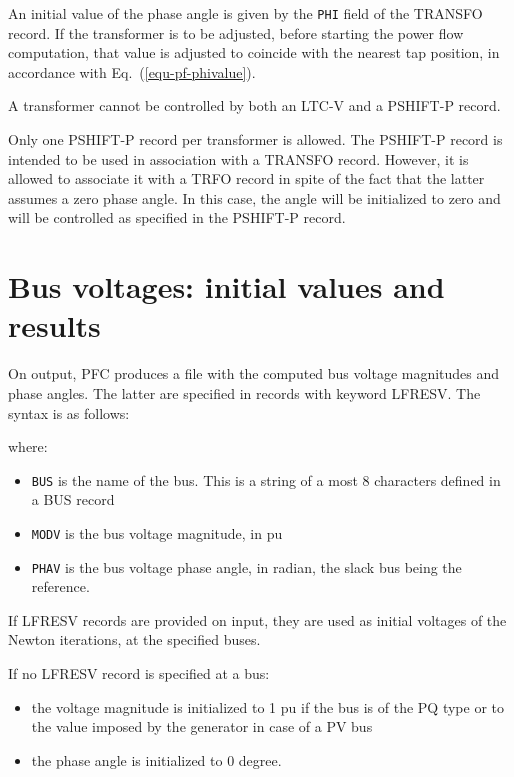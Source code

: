 An initial value of the phase angle is given by the {\tt PHI} field of the TRANSFO record. If the transformer is to be adjusted, before starting the power flow computation, that value is adjusted to coincide with the nearest tap position, in accordance with Eq.~(\ref{equ-pf-phivalue}).

A transformer cannot be controlled by both an LTC-V and a PSHIFT-P record.

Only one PSHIFT-P record per transformer is allowed. The PSHIFT-P record is intended to be used in association with a TRANSFO record. However, it is allowed to associate it with a TRFO record in spite of the fact that the latter assumes a zero phase angle. In this case, the angle will be initialized to zero and will be controlled as specified in the PSHIFT-P record.


\section{Bus voltages: initial values and results}\label{sec-lfresv}

On output, PFC produces a file with the computed bus voltage magnitudes and phase angles. The latter are specified in records with keyword LFRESV. The syntax is as follows:

\hspace*{5ex}{\tt LFRESV BUS MODV PHASV ;}

where:
\begin{itemize}
\item {\tt BUS} is the name of the bus. This is a string of a most 8 characters defined in a BUS record
\item {\tt MODV} is the bus voltage magnitude, in pu
\item {\tt PHAV} is the bus voltage phase angle, in radian, the slack bus being the reference.
\end{itemize}

If LFRESV records are provided on input, they are used as initial voltages of the Newton iterations, at the specified buses. 

If no LFRESV record is specified at a bus:
\begin{itemize}
\item the voltage magnitude is initialized to 1 pu if the bus is of the PQ type or to the value imposed by the generator in case of a PV bus
\item the phase angle is initialized to 0 degree.
\end{itemize}

